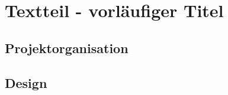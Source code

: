 \section{Textteil - vorläufiger Titel} \label{Textteil}







\subsection{Projektorganisation}

\subsection{Design}


